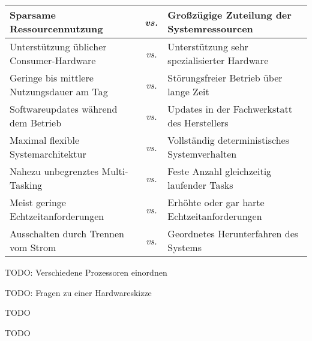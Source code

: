 \begin{longtable}{|p{} c p{}|}
    \hline
    Sparsame Ressourcennutzung
    & \textit{vs.} &
    Großzügige Zuteilung der Systemressourcen
    \\

    \hline
    Unterstützung üblicher Consumer-Hardware
    & \textit{vs.} &
    Unterstützung sehr spezialisierter Hardware
    \\

    \hline
    Geringe bis mittlere Nutzungsdauer am Tag
    & \textit{vs.} &
    Störungsfreier Betrieb über lange Zeit
    \\

    \hline
    Softwareupdates während dem Betrieb
    & \textit{vs.} &
    Updates in der Fachwerkstatt des Herstellers
    \\

    \hline
    Maximal flexible Systemarchitektur
    & \textit{vs.} &
    Vollständig deterministisches Systemverhalten
    \\

    \hline
    Nahezu unbegrenztes Multi-Tasking
    & \textit{vs.} &
    Feste Anzahl gleichzeitig laufender Tasks
    \\

    \hline
    Meist geringe Echtzeitanforderungen
    & \textit{vs.} &
    Erhöhte oder gar harte Echtzeitanforderungen
    \\

    \hline
    Ausschalten durch Trennen vom Strom
    & \textit{vs.} &
    Geordnetes Herunterfahren des Systems
    \\

    \hline
\end{longtable}

\teilaufgabe
TODO: Verschiedene Prozessoren einordnen

\teilaufgabe
TODO: Fragen zu einer Hardwareskizze

TODO

TODO

